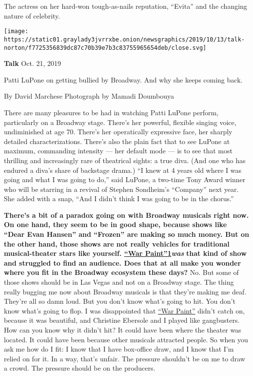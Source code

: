 The actress on her hard-won tough-as-nails reputation, ``Evita'' and the
changing nature of celebrity.

\texttt{[image: https://static01.graylady3jvrrxbe.onion/newsgraphics/2019/10/13/talk-norton/f7725356839dc87c70b39e7b3c83755965654deb/close.svg]}

\textbf{Talk} Oct. 21, 2019

Patti LuPone on getting bullied by Broadway. And why she keeps coming
back.

By David Marchese Photograph by Mamadi Doumbouya

There are many pleasures to be had in watching Patti LuPone perform,
particularly on a Broadway stage. There's her powerful, flexible singing
voice, undiminished at age 70. There's her operatically expressive face,
her sharply detailed characterizations. There's also the plain fact that
to see LuPone at maximum, commanding intensity --- her default mode ---
is to see that most thrilling and increasingly rare of theatrical
sights: a true diva. (And one who has endured a diva's share of
backstage drama.) ``I knew at 4 years old where I was going and what I
was going to do,'' said LuPone, a two-time Tony Award winner who will be
starring in a revival of Stephen Sondheim's ``Company'' next year. She
added with a snap, ``And I didn't think I was going to be in the
chorus.''

\textbf{There's a bit of a paradox going on with Broadway musicals right
now. On one hand, they seem to be in good shape, because shows like
``Dear Evan Hansen'' and ``Frozen'' are making so much money. But on the
other hand, those shows are not really vehicles for traditional
musical-theater stars like yourself.
\href{http://nytimes3xbfgragh.onion\#tooltip-1}{``War
Paint''1}\emph{was}} \textbf{that kind of show and struggled to find an
audience. Does that at all make you wonder where you fit in the Broadway
ecosystem these days?} No. But some of those shows should be in Las
Vegas and not on a Broadway stage. The thing really bugging me now about
Broadway musicals is that they're making me deaf. They're all so damn
loud. But you don't know what's going to hit. You don't know what's
going to flop. I was disappointed that
\href{https://www.nytimes3xbfgragh.onion/2017/04/06/theater/review-war-paint-patti-lupone-christine-ebersole.html}{``War
Paint''} didn't catch on, because it was beautiful, and Christine
Ebersole and I played like gangbusters. How can you know why it didn't
hit? It could have been where the theater was located. It could have
been because other musicals attracted people. So when you ask me how do
I fit: I know that I have box-office draw, and I know that I'm relied on
for it. In a way, that's unfair. The pressure shouldn't be on me to draw
a crowd. The pressure should be on the producers.

